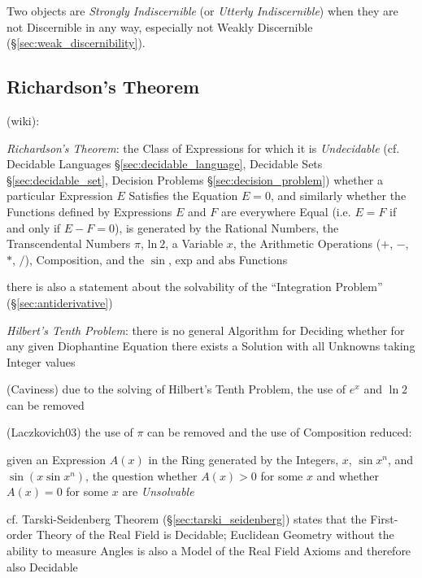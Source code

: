 Two objects are \emph{Strongly Indiscernible} (or \emph{Utterly
  Indiscernible}) when they are not Discernible in any way, especially
not Weakly Discernible (\S\ref{sec:weak_discernibility}).



\subsection{Richardson's Theorem}\label{sec:richardsons_theorem}


(wiki):

\emph{Richardson's Theorem}: the Class of Expressions for which it is
\emph{Undecidable} (cf. Decidable Languages \S\ref{sec:decidable_language},
Decidable Sets \S\ref{sec:decidable_set}, Decision Problems
\S\ref{sec:decision_problem}) whether a particular Expression $E$ Satisfies the
Equation $E = 0$, and similarly whether the Functions defined by Expressions
$E$ and $F$ are everywhere Equal (i.e. $E = F$ if and only if $E - F = 0$), is
generated by the Rational Numbers, the Transcendental Numbers $\pi$,
$\mathrm{ln}\ 2$, a Variable $x$, the Arithmetic Operations ($+$, $-$, $*$,
$/$), Composition, and the $\sin$, $\mathrm{exp}$ and $\mathrm{abs}$ Functions

there is also a statement about the solvability of the ``Integration Problem''
(\S\ref{sec:antiderivative})

\emph{Hilbert's Tenth Problem}: there is no general Algorithm for Deciding
whether for any given Diophantine Equation there exists a Solution with all
Unknowns taking Integer values

(Caviness) due to the solving of Hilbert's Tenth Problem, the use of $e^x$ and
$\ln 2$ can be removed

(Laczkovich03) the use of $\pi$ can be removed and the use of Composition
reduced:

given an Expression $A(x)$ in the Ring generated by the Integers, $x$, $\sin
x^n$, and $\sin(x \sin x^n)$, the question whether $A(x) > 0$ for some $x$ and
whether $A(x) = 0$ for some $x$ are \emph{Unsolvable}

cf. Tarski-Seidenberg Theorem (\S\ref{sec:tarski_seidenberg}) states that the
First-order Theory of the Real Field is Decidable; Euclidean Geometry without
the ability to measure Angles is also a Model of the Real Field Axioms and
therefore also Decidable



